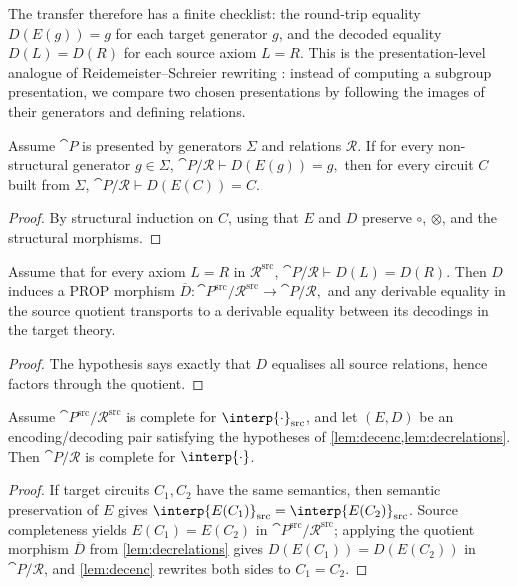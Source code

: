 The transfer therefore has a finite checklist: the round-trip equality \(D(E(g))=g\) for each
target generator \(g\), and the decoded equality \(D(L)=D(R)\) for each source axiom \(L=R\).
This is the presentation-level analogue of Reidemeister--Schreier rewriting
\cite{Reidemeister1927,Schreier1927}: instead of computing a subgroup presentation, we compare two
chosen presentations by following the images of their generators and defining relations.

\begin{lemma}\label{lem:decenc}
Assume \(\cat{P}\) is presented by generators \(\Sigma\) and relations \(\mathcal{R}\).
If for every non-structural generator \(g\in\Sigma\),
\(
  \cat{P}/\mathcal{R}\vdash D(E(g)) = g,
\)
then for every circuit \(C\) built from \(\Sigma\),
\(
  \cat{P}/\mathcal{R}\vdash D(E(C)) = C.
\)
\end{lemma}
\begin{proof}
By structural induction on \(C\), using that \(E\) and \(D\) preserve \(\circ\), \(\otimes\), and the
structural morphisms.
\end{proof}

\begin{lemma}\label{lem:decrelations}
Assume that for every axiom \(L=R\) in \(\mathcal{R}^{\mathrm{src}}\),
\(
  \cat{P}/\mathcal{R}\vdash D(L) = D(R).
\)
Then \(D\) induces a PROP morphism
\(
  \overline{D}:\cat{P}^{\mathrm{src}}/\mathcal{R}^{\mathrm{src}}\to\cat{P}/\mathcal{R},
\)
and any derivable equality in the source quotient transports to a derivable equality between its
decodings in the target theory.
\end{lemma}
\begin{proof}
The hypothesis says exactly that \(D\) equalises all source relations, hence factors through the
quotient.
\end{proof}

\begin{theorem}\label{th:completeness}
Assume \(\cat{P}^{\mathrm{src}}/\mathcal{R}^{\mathrm{src}}\) is complete for
\(\interp{\cdot}_{\mathrm{src}}\), and let \((E,D)\) be an encoding/decoding pair satisfying the
hypotheses of \cref{lem:decenc,lem:decrelations}.  Then \(\cat{P}/\mathcal{R}\) is complete for
\(\interp{\cdot}\).
\end{theorem}
\begin{proof}
If target circuits \(C_1,C_2\) have the same semantics, then semantic preservation of \(E\) gives
\(\interp{E(C_1)}_{\mathrm{src}}=\interp{E(C_2)}_{\mathrm{src}}\).  Source completeness yields
\(E(C_1)=E(C_2)\) in
\(\cat{P}^{\mathrm{src}}/\mathcal{R}^{\mathrm{src}}\); applying the quotient morphism
\(\overline{D}\) from \cref{lem:decrelations} gives \(D(E(C_1))=D(E(C_2))\) in
\(\cat{P}/\mathcal{R}\), and \cref{lem:decenc} rewrites both sides to \(C_1=C_2\).
\end{proof}


